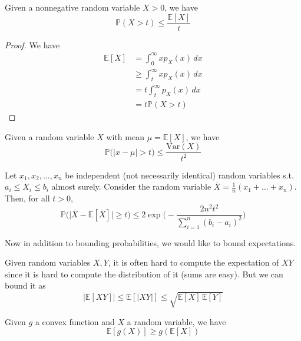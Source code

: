 \documentclass{article}
\begin{document}
    \begin{theorem}
    Given a nonnegative random variable $X > 0$, we have 
    \[\mathbb{P}(X > t) \leq \frac{\mathbb{E}[X]}{t}\]
    \end{theorem}
    \begin{proof}
    We have 
    \begin{align*}
        \mathbb{E}[X] & = \int_0^\infty x p_X (x)\,dx \\
        & \geq \int_t^\infty x p_X (x) \,dx \\
        & = t \int_t^\infty p_X (x) \,dx \\
        & = t \mathbb{P}(X > t)
    \end{align*}
    \end{proof}

    \begin{theorem}
    Given a random variable $X$ with mean $\mu = \mathbb{E}[X]$, we have 
    \[\mathbb{P}\big( |x - \mu| > t\big) \leq \frac{\mathrm{Var}(X)}{t^2}\]
    \end{theorem}

    \begin{theorem}
    Let $x_1, x_2, \ldots, x_n$ be independent (not necessarily identical) random variables s.t. $a_i \leq X_i \leq b_i$ almost surely. Consider the random variable $\overline{X} = \frac{1}{n} (x_1 + \ldots + x_n)$. Then, for all $t > 0$, 
    \[\mathbb{P}\big( \big| \overline{X} - \mathbb{E}[\overline{X}] \big| \geq t \big) \leq 2 \exp \bigg( -\frac{2 n^2 t^2}{\sum_{i=1}^n (b_i - a_i)^2} \bigg)\]
    \end{theorem}

    Now in addition to bounding probabilities, we would like to bound expectations. 

    \begin{theorem}
    Given random variables $X, Y$, it is often hard to compute the expectation of $X Y$ since it is hard to compute the distribution of it (sums are easy). But we can bound it as 
    \[|\mathbb{E}[XY]| \leq \mathbb{E}[ |XY| ] \leq \sqrt{\mathbb{E}[X] \, \mathbb{E}[Y]}\]
    \end{theorem}

    \begin{theorem}
    Given $g$ a convex function and $X$ a random variable, we have 
    \[\mathbb{E}[ g(X)] \geq g (\mathbb{E}[X])\]
    \end{theorem}
\end{document}
